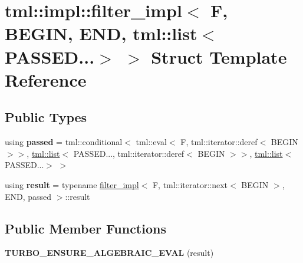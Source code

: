 \hypertarget{structtml_1_1impl_1_1filter__impl_3_01_f_00_01_b_e_g_i_n_00_01_e_n_d_00_01tml_1_1list_3_01_p_a_s_s_e_d_8_8_8_4_01_4}{\section{tml\+:\+:impl\+:\+:filter\+\_\+impl$<$ F, B\+E\+G\+I\+N, E\+N\+D, tml\+:\+:list$<$ P\+A\+S\+S\+E\+D...$>$ $>$ Struct Template Reference}
\label{structtml_1_1impl_1_1filter__impl_3_01_f_00_01_b_e_g_i_n_00_01_e_n_d_00_01tml_1_1list_3_01_p_a_s_s_e_d_8_8_8_4_01_4}
}
\subsection*{Public Types}
\begin{DoxyCompactItemize}
\item 
\hypertarget{structtml_1_1impl_1_1filter__impl_3_01_f_00_01_b_e_g_i_n_00_01_e_n_d_00_01tml_1_1list_3_01_p_a_s_s_e_d_8_8_8_4_01_4_aeb14aecd81be2a61c7bbbf9eede14299}{using {\bfseries passed} = tml\+::conditional$<$ tml\+::eval$<$ F, tml\+::iterator\+::deref$<$ B\+E\+G\+I\+N $>$$>$, \hyperlink{structtml_1_1list}{tml\+::list}$<$ P\+A\+S\+S\+E\+D..., tml\+::iterator\+::deref$<$ B\+E\+G\+I\+N $>$$>$, \hyperlink{structtml_1_1list}{tml\+::list}$<$ P\+A\+S\+S\+E\+D...$>$ $>$}\label{structtml_1_1impl_1_1filter__impl_3_01_f_00_01_b_e_g_i_n_00_01_e_n_d_00_01tml_1_1list_3_01_p_a_s_s_e_d_8_8_8_4_01_4_aeb14aecd81be2a61c7bbbf9eede14299}

\item 
\hypertarget{structtml_1_1impl_1_1filter__impl_3_01_f_00_01_b_e_g_i_n_00_01_e_n_d_00_01tml_1_1list_3_01_p_a_s_s_e_d_8_8_8_4_01_4_a9852e7be3d8365645c3b9a84aa9f3db2}{using {\bfseries result} = typename \hyperlink{structtml_1_1impl_1_1filter__impl}{filter\+\_\+impl}$<$ F, tml\+::iterator\+::next$<$ B\+E\+G\+I\+N $>$, E\+N\+D, passed $>$\+::result}\label{structtml_1_1impl_1_1filter__impl_3_01_f_00_01_b_e_g_i_n_00_01_e_n_d_00_01tml_1_1list_3_01_p_a_s_s_e_d_8_8_8_4_01_4_a9852e7be3d8365645c3b9a84aa9f3db2}

\end{DoxyCompactItemize}
\subsection*{Public Member Functions}
\begin{DoxyCompactItemize}
\item 
\hypertarget{structtml_1_1impl_1_1filter__impl_3_01_f_00_01_b_e_g_i_n_00_01_e_n_d_00_01tml_1_1list_3_01_p_a_s_s_e_d_8_8_8_4_01_4_aa5e3019a20b50d7caba3f86e0105a6ac}{{\bfseries T\+U\+R\+B\+O\+\_\+\+E\+N\+S\+U\+R\+E\+\_\+\+A\+L\+G\+E\+B\+R\+A\+I\+C\+\_\+\+E\+V\+A\+L} (result)}\label{structtml_1_1impl_1_1filter__impl_3_01_f_00_01_b_e_g_i_n_00_01_e_n_d_00_01tml_1_1list_3_01_p_a_s_s_e_d_8_8_8_4_01_4_aa5e3019a20b50d7caba3f86e0105a6ac}

\end{DoxyCompactItemize}


